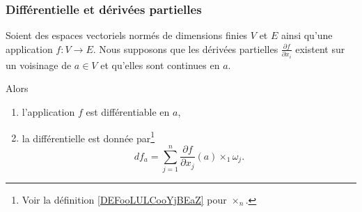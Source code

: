 \subsubsection{Différentielle et dérivées partielles}

\begin{proposition}     \label{PROPooUDJLooHwzjQF}
	Soient des espaces vectoriels normés de dimensions finies \( V\) et \( E\) ainsi qu'une application \( f\colon V\to E\). Nous supposons que les dérivées partielles \( \frac{ \partial f }{ \partial x_i }\) existent sur un voisinage de \( a\in V\) et qu'elles sont continues en \( a\).

	Alors
	\begin{enumerate}
		\item
		      l'application \( f\) est différentiable en \( a\),
		\item
		      la différentielle est donnée par\footnote{Voir la définition \ref{DEFooLULCooYjBEaZ} pour \( \times_n\).}
		      \begin{equation}
			      df_a=\sum_{j=1}^n\frac{ \partial f }{ \partial x_j }(a)\times_1\omega_j.
		      \end{equation}
	\end{enumerate}
\end{proposition}

